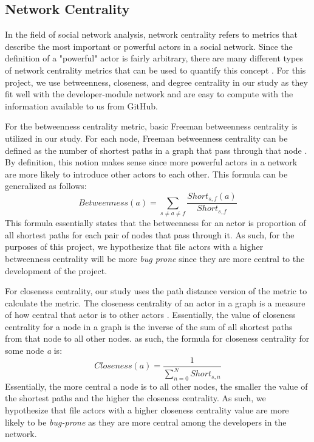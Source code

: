 \documentclass{sig-alternate-05-2015}
\begin{document}
\subsection{Network Centrality}
In the field of social network analysis, network centrality refers to metrics that describe the most important or powerful actors in a social network. Since the definition of a "powerful" actor is fairly arbitrary, there are many different types of network centrality metrics that can be used to quantify this concept \cite{hanneman:network_methods}. For this project, we use betweenness, closeness, and degree centrality in our study as they fit well with the developer-module network and are easy to compute with the information available to us from GitHub.

For the betweenness centrality metric, basic Freeman betweenness centrality is utilized in our study. For each node, Freeman betweenness centrality can be defined as the number of shortest paths in a graph that pass through that node \cite{hanneman:network_methods}. By definition, this notion makes sense since more powerful actors in a network are more likely to introduce other actors to each other. This formula can be generalized as follows:
\[Betweenness(a) = \sum_{s \neq a \neq f} \frac{Short_{s, f}(a)}{Short_{s, f}}\] 
This formula essentially states that the betweenness for an actor is proportion of all shortest paths for each pair of nodes that pass through it. As such, for the purposes of this project, we hypothesize that file actors with a higher betweenness centrality will be more \textit{bug prone} since they are more central to the development of the project.

For closeness centrality, our study uses the path distance version of the metric to calculate the metric. The closeness centrality of an actor in a graph is a measure of how central that actor is to other actors \cite{hanneman:network_methods}. Essentially, the value of closeness centrality for a node in a graph is the inverse of the sum of all shortest paths from that node to all other nodes. as such, the formula for closeness centrality for some node \textit{a} is:
\[Closeness(a) = \frac{1}{\sum_{n = 0}^{N}Short_{s, n}}\]
Essentially, the more central a node is to all other nodes, the smaller the value of the shortest paths and the higher the closeness centrality. As such, we hypothesize that file actors with a higher closeness centrality value are more likely to be \textit{bug-prone} as they are more central among the developers in the network.
\end{document}
